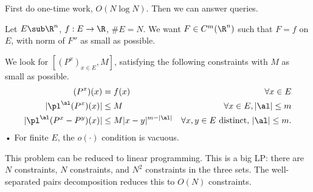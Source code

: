 
First do one-time work, $O(N\log N)$. Then we can answer queries.


Let $E\sub \R^n$, $f:E\to \R$, $\# E = N$. We want $F\in C^m(\R^n)$ such that $F=f$ on $E$, with norm of $F''$ as small as possible.

We look for $[(P^x)_{x\in E},M]$, satisfying the following constraints with $M$ as small as possible.
\begin{align}
(P^x)(x) &= f(x) &\forall x\in E\\
|\pl^\al (P^x)(x) | &\le M &\forall x\in E, |\al|\le m\\
|\pl^\al (P^x - P^y)(x)| &\le M|x-y|^{m-|\al|} &\forall x,y\in E\text{ distinct, }|\al|\le m.
\end{align}•
For finite $E$, the $o(\cdot)$ condition is vacuous.

This problem can be reduced to linear programming. This is a big LP: there are $N$ constraints, $N$ constraints, and $N^2$ constraints in the three sets. The well-separated pairs decomposition reduces this to $O(N)$ constraints.

